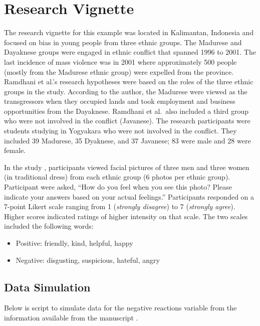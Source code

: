 \documentclass[
  11pt,
]{book}
\providecommand{\tightlist}{%
  \setlength{\itemsep}{0pt}\setlength{\parskip}{0pt}}
\begin{document}
\hypertarget{research-vignette-5}{%
\section{Research Vignette}\label{research-vignette-5}}

The research vignette for this example was located in Kalimantan, Indonesia and focused on bias in young people from three ethnic groups. The Madurese and Dayaknese groups were engaged in ethnic conflict that spanned 1996 to 2001. The last incidence of mass violence was in 2001 where approximately 500 people (mostly from the Madurese ethnic group) were expelled from the province. Ramdhani et al.'s \citeyearpar{ramdhani_affective_2018} research hypotheses were based on the roles of the three ethnic groups in the study. According to the author, the Madurese were viewed as the transgressors when they occupied lands and took employment and business opportunities from the Dayaknese. Ramdhani et al.~also included a third group who were not involved in the conflict (Javanese). The research participants were students studying in Yogyakara who were not involved in the conflict. They included 39 Madurese, 35 Dyaknese, and 37 Javanese; 83 were male and 28 were female.

In the study \citep{ramdhani_affective_2018}, participants viewed facial pictures of three men and three women (in traditional dress) from each ethnic group (6 photos per ethnic group). Participant were asked, ``How do you feel when you see this photo? Please indicate your answers based on your actual feelings.'' Participants responded on a 7-point Likert scale ranging from 1 (\emph{strongly disagree}) to 7 (\emph{strongly agree}). Higher scores indicated ratings of higher intensity on that scale. The two scales included the following words:

\begin{itemize}
\tightlist
\item
  Positive: friendly, kind, helpful, happy
\item
  Negative: disgusting, suspicious, hateful, angry
\end{itemize}

\hypertarget{data-simulation-3}{%
\subsection{Data Simulation}\label{data-simulation-3}}

Below is script to simulate data for the negative reactions variable from the information available from the manuscript \citep{ramdhani_affective_2018}.
\end{document}

